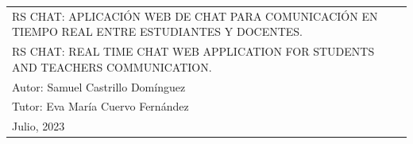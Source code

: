 \begin{table}[ht]
\begin{tabular}{p{1\linewidth}}
		\LARGE{\uppercase{RS Chat: Aplicación web de chat para comunicación en tiempo real entre estudiantes y docentes.}}
		\\[5ex]

		\LARGE{\uppercase{RS Chat: Real time chat web application for students and teachers communication.}}
		\\[6ex]

		\hfill\large{Autor: Samuel Castrillo Domínguez}
		\\[3pt]
		\hfill\large{Tutor: Eva María Cuervo Fernández}
		\\[5ex]

		\huge{Julio, 2023}
	\end{tabular}
\end{table}
